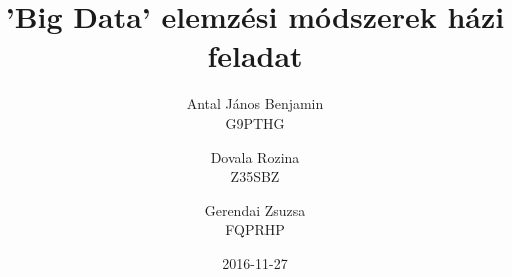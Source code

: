 \documentclass{article}
\date{2016-11-27}
\title{'Big Data' elemzési módszerek házi feladat}
\author{Antal János Benjamin\\G9PTHG \and Dovala Rozina\\Z35SBZ \and Gerendai Zsuzsa\\FQPRHP}
\numberwithin{figure}{section}
\numberwithin{table}{section}
\begin{document}
	\begin{sloppypar}
		\maketitle
		\newpage
		\tableofcontents
		\newpage
		
		\newpage
		
		\newpage
		
		\newpage
		
	\end{sloppypar}
\end{document}
